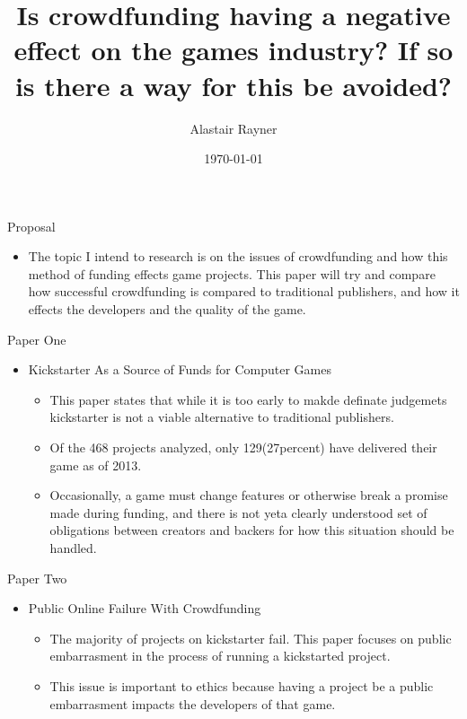 \documentclass{beamer}
\title{Is crowdfunding having a negative effect on the games industry? If so is there a way for this be avoided?}
\author{Alastair Rayner}
\date{\today}
\begin{document}
\maketitle

\begin{frame}{Proposal}
	\begin{itemize}
	\pause
		\item The topic I intend to research is on the issues of crowdfunding and how this method of funding effects game projects. This paper will try and  compare how successful crowdfunding is compared to traditional publishers, and how it effects the developers and the quality of the game.  \pause
	\end{itemize}
\end{frame}

\begin{frame}{Paper One}
	\begin{itemize}
		\item Kickstarter As a Source of Funds for Computer Games \pause
			\begin{itemize}
				\item This paper states that while it is too early to makde definate judgemets kickstarter is not a viable alternative to traditional publishers. \pause
				\item Of the 468 projects analyzed, only 129(27percent) have delivered their game as of 2013. \pause
				\item Occasionally, a game must change features or otherwise break a promise made during funding, 
and there is not yeta clearly understood set of obligations between creators and backers for how this situation should be handled. \pause
			\end{itemize}
	\end{itemize}
\end{frame}

\begin{frame}{Paper Two}
	\begin{itemize}
		\item Public Online Failure With Crowdfunding \pause
			\begin{itemize}
				\item The majority of projects on kickstarter fail. This paper focuses on public embarrasment in the process of running a kickstarted project. \pause
				\item This issue is important to ethics because having a project be a public embarrasment impacts the developers of that game.\pause
			\end{itemize}
	\end{itemize}
\end{frame}
\end{document}
